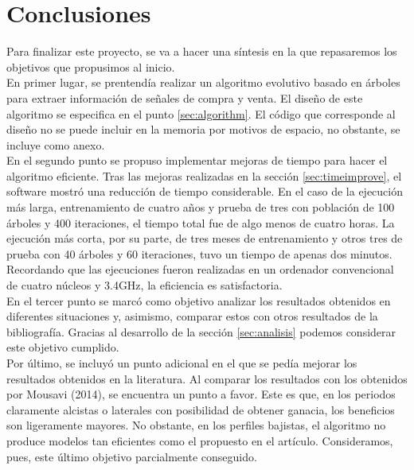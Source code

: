 \newpage
\section{Conclusiones}
Para finalizar este proyecto, se va a hacer una s\'intesis en la que repasaremos los objetivos que propusimos al inicio.\\

En primer lugar, se prentend\'ia realizar un algoritmo evolutivo basado en \'arboles para extraer informaci\'on de se\~nales de compra y venta. El dise\~no de este algoritmo se especifica en el punto \ref{sec:algorithm}. El c\'odigo que corresponde al dise\~no no se puede incluir en la memoria por motivos de espacio, no obstante, se incluye como anexo.\\

En el segundo punto se propuso implementar mejoras de tiempo para hacer el algoritmo eficiente. Tras las mejoras realizadas en la secci\'on \ref{sec:timeimprove}, el software mostr\'o una reducci\'on de tiempo considerable. En el caso de la ejecuci\'on m\'as larga, entrenamiento de cuatro a\~nos y prueba de tres con poblaci\'on de 100 \'arboles y 400 iteraciones, el tiempo total fue de algo menos de cuatro horas. La ejecuci\'on m\'as corta, por su parte, de tres meses de entrenamiento y otros tres de prueba con 40 \'arboles y 60 iteraciones, tuvo un tiempo de apenas dos minutos. Recordando que las ejecuciones fueron realizadas en un ordenador convencional de cuatro n\'ucleos y 3.4GHz, la eficiencia es satisfactoria.\\

En el tercer punto se marc\'o como objetivo analizar los resultados obtenidos en diferentes situaciones y, asimismo, comparar estos con otros resultados de la bibliograf\'ia. Gracias al desarrollo de la secci\'on \ref{sec:analisis} podemos considerar este objetivo cumplido.\\

Por \'ultimo, se incluy\'o un punto adicional en el que se ped\'ia mejorar los resultados obtenidos en la literatura. Al comparar los resultados con los obtenidos por Mousavi (2014), se encuentra un punto a favor. Este es que, en los periodos claramente alcistas o laterales con posibilidad de obtener ganacia, los beneficios son ligeramente mayores. No obstante, en los perfiles bajistas, el algoritmo no produce modelos tan eficientes como el propuesto en el art\'iculo. Consideramos, pues, este \'ultimo objetivo parcialmente conseguido.\\



